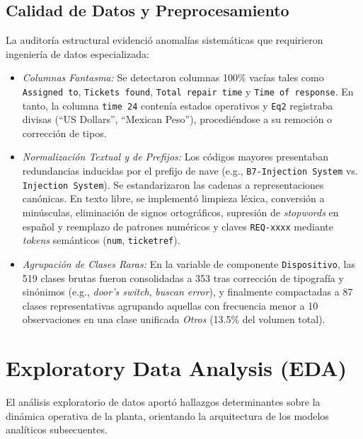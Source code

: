 \documentclass[conference]{IEEEtran}
\begin{document}
\subsection{Calidad de Datos y Preprocesamiento}
La auditoría estructural evidenció anomalías sistemáticas que requirieron ingeniería de datos especializada:
\begin{itemize}
    \item \textit{Columnas Fantasma:} Se detectaron columnas 100\% vacías tales como \texttt{Assigned to}, \texttt{Tickets found}, \texttt{Total repair time} y \texttt{Time of response}. En tanto, la columna \texttt{time 24} contenía estados operativos y \texttt{Eq2} registraba divisas (``US Dollars'', ``Mexican Peso''), procediéndose a su remoción o corrección de tipos.
    \item \textit{Normalización Textual y de Prefijos:} Los códigos mayores presentaban redundancias inducidas por el prefijo de nave (e.g., \texttt{B7-Injection System} vs. \texttt{Injection System}). Se estandarizaron las cadenas a representaciones canónicas. En texto libre, se implementó limpieza léxica, conversión a minúsculas, eliminación de signos ortográficos, supresión de \textit{stopwords} en español y reemplazo de patrones numéricos y claves \texttt{REQ-xxxx} mediante \textit{tokens} semánticos (\texttt{num}, \texttt{ticketref}).
    \item \textit{Agrupación de Clases Raras:} En la variable de componente \texttt{Dispositivo}, las 519 clases brutas fueron consolidadas a 353 tras corrección de tipografía y sinónimos (e.g., \textit{door's switch}, \textit{buscan error}), y finalmente compactadas a 87 clases representativas agrupando aquellas con frecuencia menor a 10 observaciones en una clase unificada \textit{Otros} (13.5\% del volumen total).
\end{itemize}

\section{Exploratory Data Analysis (EDA)}
El análisis exploratorio de datos aportó hallazgos determinantes sobre la dinámica operativa de la planta, orientando la arquitectura de los modelos analíticos subsecuentes.
\end{document}
